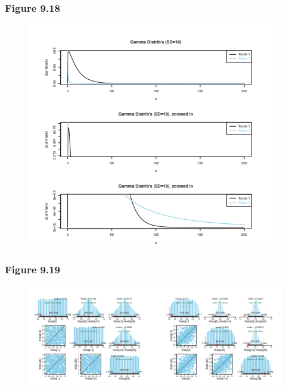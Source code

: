 \documentclass[usenames,dvipsnames,table]{beamer}
\begin{document}
\begin{frame}
\frametitle{Figure 9.18}
\begin{figure}
\centering
\includegraphics[height=0.8\textheight]{img/fig9_18}
\end{figure}
\end{frame}

\begin{frame}
\frametitle{Figure 9.19}
\begin{figure}
\centering
\includegraphics[width=\linewidth]{img/fig9_19}
\end{figure}
\end{frame}
\end{document}
